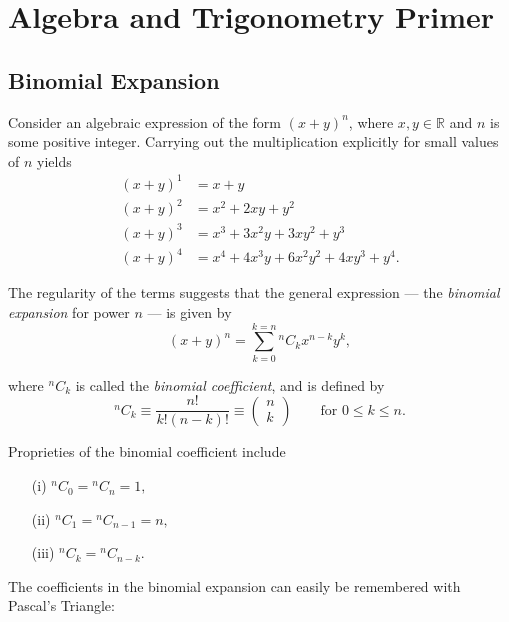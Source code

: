 \documentclass{article}
\newcommand{\R}{\mathbb{R}}
\begin{document}
\section{Algebra and Trigonometry Primer}

\subsection{Binomial Expansion}

Consider an algebraic expression of the form $\left( x + y \right)^n$, where $x, y \in \R$ and $n$ is some positive integer. Carrying out the multiplication explicitly for small values of $n$ yields
\begin{align*}
    \left( x + y \right)^1 &= x + y \\
    \left( x + y \right)^2 &= x^2 + 2xy + y^2 \\
    \left( x + y \right)^3 &= x^3 + 3x^2y + 3xy^2 + y^3 \\
    \left( x + y \right)^4 &= x^4 + 4x^3y + 6x^2y^2 + 4xy^3 + y^4.
\end{align*}

The regularity of the terms suggests that the general expression --- the \emph{binomial expansion} for power $n$ --- is given by
\begin{equation*}
    \left( x + y \right)^n = \sum\limits_{k = 0}^{k = n} {}^n C_k x^{n - k} y^k,
\end{equation*}

where ${}^n C_k$ is called the \emph{binomial coefficient}, and is defined by
\begin{equation*}
    {}^n C_k \equiv \frac{n!}{k! \left( n - k \right)!} \equiv \begin{pmatrix} n \\ k \end{pmatrix} \qquad \text{for } 0 \leqslant k \leqslant n.
\end{equation*}

Proprieties of the binomial coefficient include
\begin{enumerate}
\item[(i)] $\displaystyle {}^n C_0 = {}^n C_n = 1,$
\item[(ii)] $\displaystyle {}^n C_1 = {}^n C_{n - 1} = n,$
\item[(iii)] $\displaystyle {}^n C_k = {}^n C_{n - k}.$
\end{enumerate}

The coefficients in the binomial expansion can easily be remembered with Pascal's Triangle:
\end{document}
